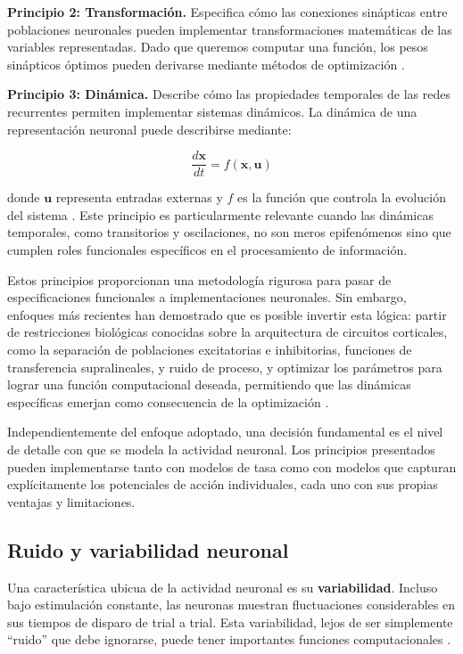 \textbf{Principio 2: Transformación.} Especifica cómo las conexiones sinápticas entre poblaciones neuronales pueden implementar transformaciones matemáticas de las variables representadas. Dado que queremos computar una función, los pesos sinápticos óptimos pueden derivarse mediante métodos de optimización \citep{eliasmith2003neural}.

\textbf{Principio 3: Dinámica.} Describe cómo las propiedades temporales de las redes recurrentes permiten implementar sistemas dinámicos. La dinámica de una representación neuronal puede describirse mediante:

\begin{equation}
\frac{d\mathbf{x}}{dt} = f(\mathbf{x}, \mathbf{u})
\label{eq:neural_dynamics}
\end{equation}

donde $\mathbf{u}$ representa entradas externas y $f$ es la función que controla la evolución del sistema \citep{eliasmith2003neural}. Este principio es particularmente relevante cuando las dinámicas temporales, como transitorios y oscilaciones, no son meros epifenómenos sino que cumplen roles funcionales específicos en el procesamiento de información.

Estos principios proporcionan una metodología rigurosa para pasar de especificaciones funcionales a implementaciones neuronales. Sin embargo, enfoques más recientes han demostrado que es posible invertir esta lógica: partir de restricciones biológicas conocidas sobre la arquitectura de circuitos corticales, como la separación de poblaciones excitatorias e inhibitorias, funciones de transferencia supralineales, y ruido de proceso, y optimizar los parámetros para lograr una función computacional deseada, permitiendo que las dinámicas específicas emerjan como consecuencia de la optimización \citep{echeveste2020cortical}.

Independientemente del enfoque adoptado, una decisión fundamental es el nivel de detalle con que se modela la actividad neuronal. Los principios presentados pueden implementarse tanto con modelos de tasa como con modelos que capturan explícitamente los potenciales de acción individuales, cada uno con sus propias ventajas y limitaciones.

\subsection{Ruido y variabilidad neuronal}
\label{subsec:ruido_neuronal}

Una característica ubicua de la actividad neuronal es su \textbf{variabilidad}. Incluso bajo estimulación constante, las neuronas muestran fluctuaciones considerables en sus tiempos de disparo de trial a trial. Esta variabilidad, lejos de ser simplemente ``ruido'' que debe ignorarse, puede tener importantes funciones computacionales \citep{gerstner2002spiking}.

